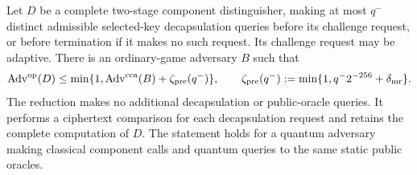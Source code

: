 \begin{proposition}
\label{prop:kem-deferred-challenge}
Let $D$ be a complete two-stage component distinguisher, making at most
$q^-$ distinct admissible selected-key decapsulation queries before its
challenge request, or before termination if it makes no such request.
Its challenge request may be adaptive. There is an ordinary-game
adversary $B$ such that
\begin{equation}
 \operatorname{Adv}^{\rm op}(D)
 \le \min\{1,\operatorname{Adv}^{\rm cca}(B)
                 +\zeta_{\rm pre}(q^-)\},
 \qquad
 \zeta_{\rm pre}(q^-)
 :=\min\{1,q^-2^{-256}+\delta_{\rm mr}\}.
 \label{eq:kem-deferred-bridge}
\end{equation}
The reduction makes no additional decapsulation or public-oracle queries.
It performs a ciphertext comparison for each decapsulation request and
retains the complete computation of $D$. The statement holds for a
quantum adversary making classical component calls and quantum queries
to the same static public oracles.
\end{proposition}
